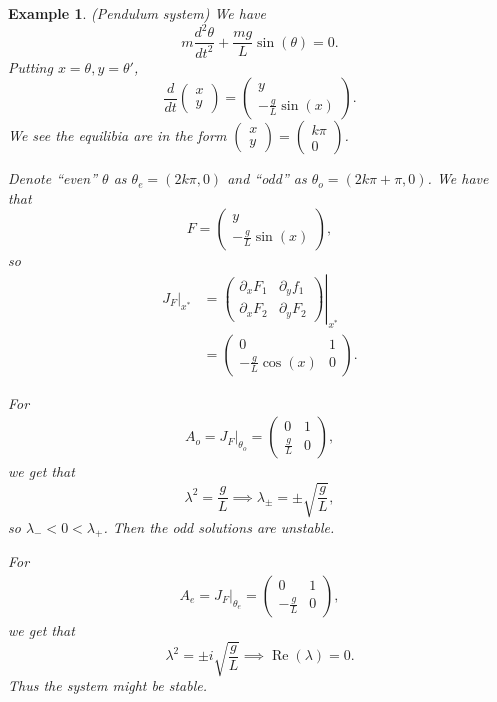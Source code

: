 \documentclass{tufte-handout}
\newtheorem{ex}[thm]{Example}
\theoremstyle{definition}
\begin{document}
\begin{ex}
	(Pendulum system) We have \[
		m \frac{d^2 \theta}{dt^2} + \frac{mg}{L} \sin{\left(\theta\right)} = 0 
	.\] Putting $x=\theta, y=\theta'$, \[
		\frac{d}{dt} \begin{pmatrix}
		x \\
		y
		\end{pmatrix} = \begin{pmatrix}
		y \\
		-\frac{g}{L} \sin{\left(x\right)}
		\end{pmatrix} 
	.\] We see the equilibia are in the form $\begin{pmatrix}
	x \\
	y
	\end{pmatrix} = \begin{pmatrix}
	k\pi \\
	0
	\end{pmatrix}$.

	Denote ``even'' $\theta$ as $\theta_e = (2k\pi, 0)$ and ``odd'' as $\theta_o = (2k\pi + \pi, 0)$. We have that \[
		F = \begin{pmatrix}
		y \\
		-\frac{g}{L} \sin{\left(x\right)}
		\end{pmatrix} 
	,\] so
	\begin{align*}
		\left. J_F\right|_{x^*} &= \left.\begin{pmatrix}
		\partial_x F_1 & \partial_y f_1 \\
		\partial_x F_2 & \partial_y F_2
		\end{pmatrix} \right|_{x^*} \\
										&= \begin{pmatrix}
										0 & 1 \\
										-\frac{g}{L}\cos{\left(x\right)} & 0
										\end{pmatrix} 
	.\end{align*}

	For 
	\begin{align*}
		A_o = \left. J_F\right|_{\theta_o} = \begin{pmatrix}
		0 & 1 \\
		\frac{g}{L} & 0
		\end{pmatrix} 
	,\end{align*} we get that \[
		\lambda^2 = \frac{g}{L} \implies \lambda_{\pm} = \pm \sqrt{\frac{g}{L}} 
	,\] so $\lambda_- < 0 < \lambda_+$. Then the odd solutions are unstable.

	For 
	\begin{align*}
		A_e =  \left. J_F\right|_{\theta_e} = \begin{pmatrix}
		0 & 1 \\
		-\frac{g}{L} & 0
		\end{pmatrix} 
	,\end{align*} we get that \[
	\lambda^2 = \pm i \sqrt{\frac{g}{L}} \implies \operatorname{Re}(\lambda)= 0
	.\] Thus the system might be stable.
\end{ex}
\end{document}
